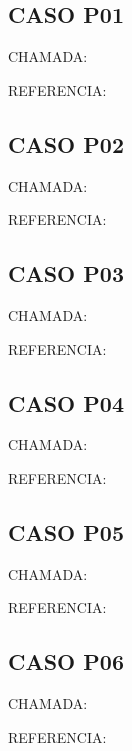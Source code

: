 \documentclass{undftex}
\begin{document}
\begin{refsection}\section*{CASO P01}\noindent CHAMADA: \par\noindent REFERENCIA:\par\printbibliography[heading=none]\end{refsection}\clearpage
\begin{refsection}\section*{CASO P02}\noindent CHAMADA: \par\noindent REFERENCIA:\par\printbibliography[heading=none]\end{refsection}\clearpage
\begin{refsection}\section*{CASO P03}\noindent CHAMADA: \par\noindent REFERENCIA:\par\printbibliography[heading=none]\end{refsection}\clearpage
\begin{refsection}\section*{CASO P04}\noindent CHAMADA: \par\noindent REFERENCIA:\par\printbibliography[heading=none]\end{refsection}\clearpage
\begin{refsection}\section*{CASO P05}\noindent CHAMADA: \par\noindent REFERENCIA:\par\printbibliography[heading=none]\end{refsection}\clearpage
\begin{refsection}\section*{CASO P06}\noindent CHAMADA: \par\noindent REFERENCIA:\par\printbibliography[heading=none]\end{refsection}\clearpage
\end{document}
